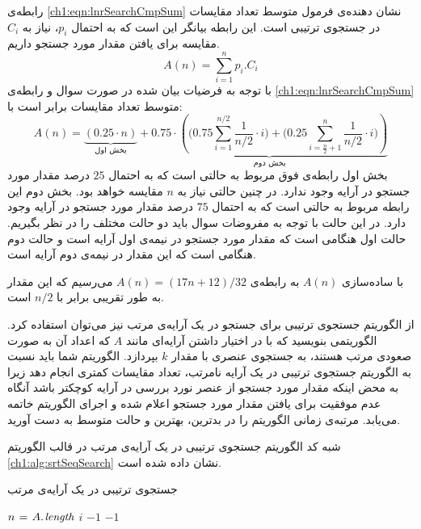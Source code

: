 {

رابطه‌ی {\eqref{ch1:eqn:lnrSearchCmpSum}} نشان دهنده‌ی فرمول متوسط تعداد مقایسات در جستجوی ترتیبی است. این رابطه بیانگر این است که به احتمال {$p_i$}، نیاز به {$C_i$} مقایسه برای یافتن مقدار مورد جستجو داریم.
\begin{equation}
A(n) = \sum_{i=1}^{n}{p_i . C_i}\label{ch1:eqn:lnrSearchCmpSum}
\end{equation}
با توجه به فرضیات بیان شده در صورت سوال و رابطه‌ی {\eqref{ch1:eqn:lnrSearchCmpSum}} متوسط تعداد مقایسات برابر است با:
\begin{displaymath}
A(n) = \underbrace{\left( 0.25\cdot n\right)}_{\text{بخش اول}} +
\underbrace{0.75\cdot\left(\biggl( 0.75\sum_{i=1}^{n/2}{\frac{1}{n/2} \cdot i} \biggr) + \biggl( 0.25\sum_{i=\frac{n}{2}+1}^{n}{\frac{1}{n/2}\cdot i} \biggr) \right) }_{\text{بخش دوم}}
\end{displaymath}
بخش اول رابطه‌ی فوق مربوط به حالتی است که به احتمال {$25$} درصد مقدار مورد جستجو در آرایه وجود ندارد. در چنین حالتی نیاز به {$n$} مقایسه خواهد بود. بخش دوم این رابطه مربوط به حالتی است که به احتمال {$75$} درصد مقدار مورد جستجو در آرایه وجود دارد. در این حالت با توجه به مفروضات سوال باید دو حالت مختلف را در نظر بگیریم. حالت اول هنگامی است که مقدار مورد جستجو در نیمه‌ی اول آرایه است و حالت دوم هنگامی است که این مقدار در نیمه‌ی دوم آرایه است.

با ساده‌سازی {$A(n)$} به رابطه‌ی {$A(n)=(17n+12)/32$} می‌رسیم که این مقدار به طور تقریبی برابر با {$n/2$} است.

 از الگوریتم جستجوی ترتیبی برای جستجو در یک آرایه‌ی مرتب نیز می‌توان استفاده کرد. الگوریتمی بنویسید که با در اختیار داشتن آرایه‌ای مانند {$A$}  که اعداد آن به صورت صعودی مرتب هستند، به جستجوی عنصری با مقدار {$k$} بپردازد. الگوریتم شما باید نسبت به الگوریتم جستجوی ترتیبی در یک آرایه نامرتب، تعداد مقایسات کمتری انجام دهد زیرا به محض اینکه مقدار مورد جستجو از عنصر نورد بررسی در آرایه کوچکتر باشد آنگاه عدم موفقیت برای یافتن مقدار مورد جستجو اعلام شده و اجرای الگوریتم خاتمه می‌یابد. مرتبه‌ی زمانی الگوریتم را در بدترین، بهترین و حالت متوسط به دست آورید.


شبه کد الگوریتم جستجوی ترتیبی در یک آرایه‌ی مرتب در قالب الگوریتم {\eqref{ch1:alg:srtSeqSearch}} نشان داده شده است.

\begin{algorithm}
\caption{جستجوی ترتیبی در یک آرایه‌ی مرتب}\label{ch1:alg:srtSeqSearch}
\begin{latin}
\begin{algorithmic}[1]
		\State	$n \mathrel{\hspace{1pt}=\hspace{1pt}} A.\hspace*{1pt}\mathit{length}$
						\State	\Return $i$
						\State	\Return $-1$
				\EndIf
		\EndFor
		\State	\Return	$-1$		
\EndFunction
\end{algorithmic}
\end{latin}
\end{algorithm}

}
